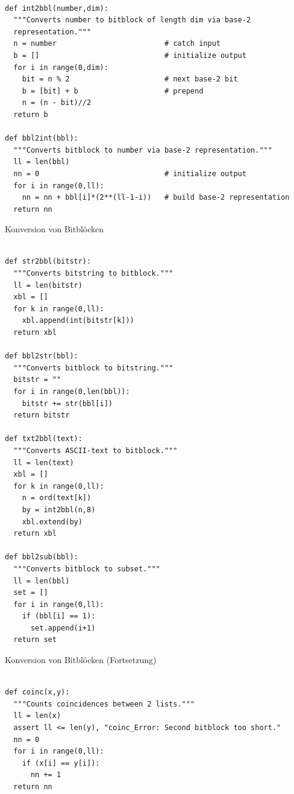 \begin{refsegment}
\begin{sagecode}
\begin{verbatim}

def int2bbl(number,dim):
  """Converts number to bitblock of length dim via base-2
  representation."""
  n = number                         # catch input
  b = []                             # initialize output
  for i in range(0,dim):
    bit = n % 2                      # next base-2 bit
    b = [bit] + b                    # prepend
    n = (n - bit)//2
  return b

def bbl2int(bbl):
  """Converts bitblock to number via base-2 representation."""
  ll = len(bbl)
  nn = 0                             # initialize output
  for i in range(0,ll):
    nn = nn + bbl[i]*(2**(ll-1-i))   # build base-2 representation
  return nn
\end{verbatim}
\caption{Konversion von Bitblöcken
   }\label{Sage-code-bool-conv-bbl}
\end{sagecode}

\begin{sagecode}
\begin{verbatim}

def str2bbl(bitstr):
  """Converts bitstring to bitblock."""
  ll = len(bitstr)
  xbl = []
  for k in range(0,ll):
    xbl.append(int(bitstr[k]))
  return xbl

def bbl2str(bbl):
  """Converts bitblock to bitstring."""
  bitstr = ""
  for i in range(0,len(bbl)):
    bitstr += str(bbl[i])
  return bitstr

def txt2bbl(text):
  """Converts ASCII-text to bitblock."""
  ll = len(text)
  xbl = []
  for k in range(0,ll):
    n = ord(text[k])
    by = int2bbl(n,8)
    xbl.extend(by)
  return xbl

def bbl2sub(bbl):
  """Converts bitblock to subset."""
  ll = len(bbl)
  set = []
  for i in range(0,ll):
    if (bbl[i] == 1):
      set.append(i+1)
  return set
\end{verbatim}
\caption{Konversion von Bitblöcken (Fortsetzung)}\label{Sage-code-bool-conv-bbl1}
\end{sagecode}

\begin{sagecode}
\begin{verbatim}

def coinc(x,y):
  """Counts coincidences between 2 lists."""
  ll = len(x)
  assert ll <= len(y), "coinc_Error: Second bitblock too short."
  nn = 0
  for i in range(0,ll):
    if (x[i] == y[i]):
      nn += 1
  return nn


\end{verbatim}
\end{sagecode}
\end{refsegment}
